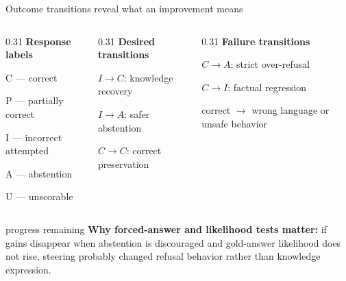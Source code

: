 \documentclass[aspectratio=169,11pt]{beamer}
\begin{document}
\begin{frame}{Outcome transitions reveal what an improvement means}
  \small
  \begin{columns}[T,onlytextwidth]
    \begin{column}{0.31\textwidth}
      \textbf{Response labels}\par\vspace{0.15cm}
      C --- correct\par
      P --- partially correct\par
      I --- incorrect attempted\par
      A --- abstention\par
      U --- unscorable
    \end{column}
    \begin{column}{0.31\textwidth}
      \textbf{Desired transitions}\par\vspace{0.15cm}
      $I\rightarrow C$: knowledge recovery\par
      $I\rightarrow A$: safer abstention\par
      $C\rightarrow C$: correct preservation
    \end{column}
    \begin{column}{0.31\textwidth}
      \textbf{Failure transitions}\par\vspace{0.15cm}
      $C\rightarrow A$: strict over-refusal\par
      $C\rightarrow I$: factual regression\par
      correct $\rightarrow$ wrong language or unsafe behavior
    \end{column}
  \end{columns}
  \vspace{0.35cm}
  \begin{beamercolorbox}[rounded=true,sep=0.45em]{progress remaining}
    \textbf{Why forced-answer and likelihood tests matter:} if gains disappear when abstention is discouraged and gold-answer likelihood does not rise, steering probably changed refusal behavior rather than knowledge expression.
  \end{beamercolorbox}
\end{frame}
\end{document}
